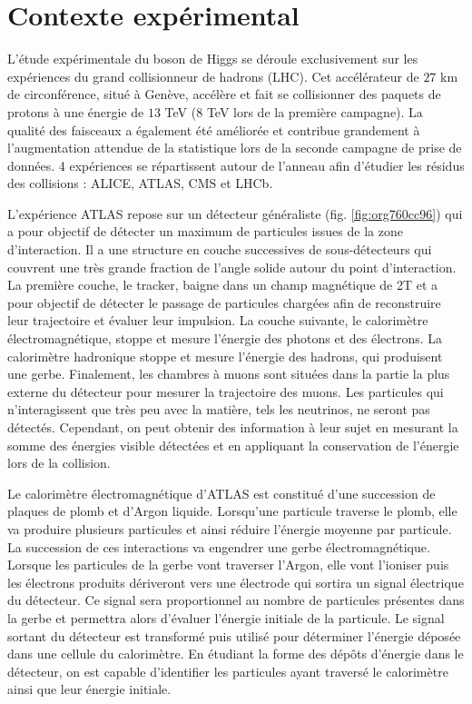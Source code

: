 \section{Contexte expérimental}

L'étude expérimentale du boson de Higgs se déroule exclusivement sur les expériences du grand collisionneur de hadrons (LHC).
Cet accélérateur de $27$ km de circonférence, situé à Genève, accélère et fait se collisionner des paquets de protons à une énergie de $13$ TeV ($8$ TeV lors de la première campagne).
La qualité des faisceaux a également été améliorée et contribue grandement à l'augmentation attendue de la statistique lors de la seconde campagne de prise de données.
4 expériences se répartissent autour de l'anneau afin d'étudier les résidus des collisions : ALICE, ATLAS, CMS et LHCb.

L'expérience ATLAS repose sur un détecteur généraliste (fig. \ref{fig:org760cc96}) qui a pour objectif de détecter un maximum de particules issues de la zone d'interaction.
Il a une structure en couche successives de sous-détecteurs qui couvrent une très grande fraction de l'angle solide autour du point d'interaction.
La première couche, le tracker, baigne dans un champ magnétique de 2T et a pour objectif de détecter le passage de particules chargées afin de reconstruire leur trajectoire et évaluer leur impulsion.
La couche suivante, le calorimètre électromagnétique, stoppe et mesure l'énergie des photons et des électrons.
La calorimètre hadronique stoppe et mesure l'énergie des hadrons, qui produisent une gerbe.
Finalement, les chambres à muons sont situées dans la partie la plus externe du détecteur pour mesurer la trajectoire des muons.
Les particules qui n'interagissent que très peu avec la matière, tels les neutrinos, ne seront pas détectés.
Cependant, on peut obtenir des information à leur sujet en mesurant la somme des énergies visible détectées et en appliquant la conservation de l'énergie lors de la collision.

Le calorimètre électromagnétique d'ATLAS est constitué d'une succession de plaques de plomb et d'Argon liquide.
Lorsqu'une particule traverse le plomb, elle va produire plusieurs particules et ainsi réduire l'énergie moyenne par particule.
La succession de ces interactions va engendrer une gerbe électromagnétique.
Lorsque les particules de la gerbe vont traverser l'Argon, elle vont l'ioniser puis les électrons produits dériveront vers une électrode qui sortira un signal électrique du détecteur.
Ce signal sera proportionnel au nombre de particules présentes dans la gerbe et permettra alors d'évaluer l'énergie initiale de la particule.
Le signal sortant du détecteur est transformé puis utilisé pour déterminer l'énergie déposée dans une cellule du calorimètre.
En étudiant la forme des dépôts d'énergie dans le détecteur, on est capable d'identifier les particules ayant traversé le calorimètre ainsi que leur énergie initiale.

